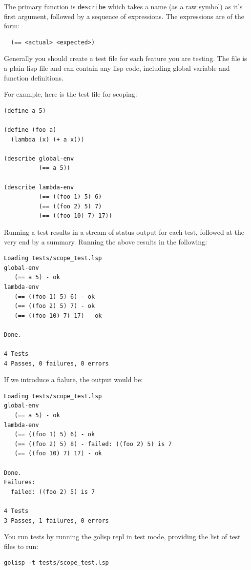 \documentclass[12pt]{article}
\begin{document}
The primary function is \verb|describe| which takes a name (as a raw
symbol) as it's first argument, followed by a sequence of expressions.
The expressions are of the form:

\begin{verbatim}
  (== <actual> <expected>)
\end{verbatim}

Generally you should create a test file for each feature you are
testing. The file is a plain lisp file and can contain any lisp code,
including global variable and function definitions.

For example, here is the test file for scoping:

\begin{verbatim}
(define a 5)

(define (foo a)
  (lambda (x) (+ a x)))

(describe global-env
          (== a 5))

(describe lambda-env
          (== ((foo 1) 5) 6)
          (== ((foo 2) 5) 7)
          (== ((foo 10) 7) 17))
\end{verbatim}

Running a test results in a stream of status output for each test,
followed at the very end by a summary.  Running the above results in
the following:

\begin{verbatim}
Loading tests/scope_test.lsp
global-env
   (== a 5) - ok
lambda-env
   (== ((foo 1) 5) 6) - ok
   (== ((foo 2) 5) 7) - ok
   (== ((foo 10) 7) 17) - ok

Done.

4 Tests
4 Passes, 0 failures, 0 errors
\end{verbatim}

If we introduce a fialure, the output would be:

\begin{verbatim}
Loading tests/scope_test.lsp
global-env
   (== a 5) - ok
lambda-env
   (== ((foo 1) 5) 6) - ok
   (== ((foo 2) 5) 8) - failed: ((foo 2) 5) is 7
   (== ((foo 10) 7) 17) - ok

Done.
Failures:
  failed: ((foo 2) 5) is 7

4 Tests
3 Passes, 1 failures, 0 errors
\end{verbatim}

You run tests by running the golisp repl in test mode, providing the list of test files to run:

\begin{verbatim}
golisp -t tests/scope_test.lsp
\end{verbatim}
\end{document}
